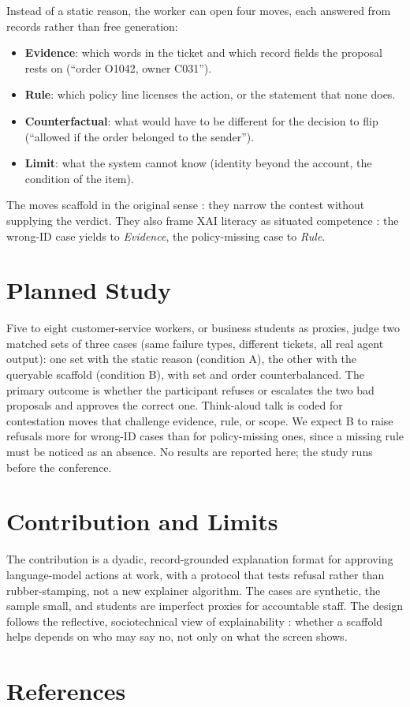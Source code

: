 \documentclass[11pt,a4paper]{article}
\begin{document}
Instead of a static reason, the worker can open four moves, each answered from records rather than free generation:

\begin{itemize}
  \setlength{\itemsep}{0pt}
  \item \textbf{Evidence}: which words in the ticket and which record fields the proposal rests on (``order O1042, owner C031'').
  \item \textbf{Rule}: which policy line licenses the action, or the statement that none does.
  \item \textbf{Counterfactual}: what would have to be different for the decision to flip (``allowed if the order belonged to the sender'').
  \item \textbf{Limit}: what the system cannot know (identity beyond the account, the condition of the item).
\end{itemize}

The moves scaffold in the original sense \parencite{Wood1976}: they narrow the contest without supplying the verdict. They also frame XAI literacy as situated competence \parencite{Long2020}: the wrong-ID case yields to \emph{Evidence}, the policy-missing case to \emph{Rule}.

\section*{Planned Study}

Five to eight customer-service workers, or business students as proxies, judge two matched sets of three cases (same failure types, different tickets, all real agent output): one set with the static reason (condition A), the other with the queryable scaffold (condition B), with set and order counterbalanced. The primary outcome is whether the participant refuses or escalates the two bad proposals and approves the correct one. Think-aloud talk is coded for contestation moves that challenge evidence, rule, or scope. We expect B to raise refusals more for wrong-ID cases than for policy-missing ones, since a missing rule must be noticed as an absence. No results are reported here; the study runs before the conference.

\section*{Contribution and Limits}

The contribution is a dyadic, record-grounded explanation format for approving language-model actions at work, with a protocol that tests refusal rather than rubber-stamping, not a new explainer algorithm. The cases are synthetic, the sample small, and students are imperfect proxies for accountable staff. The design follows the reflective, sociotechnical view of explainability \parencite{Ehsan2020}: whether a scaffold helps depends on who may say no, not only on what the screen shows.

\section*{References}

\printbibliography[heading=none]
\end{document}
